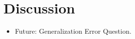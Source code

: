 \section{Discussion}
\label{sec:Discussion}
\begin{itemize}
\item Future: Generalization Error Question. 

\end{itemize}
